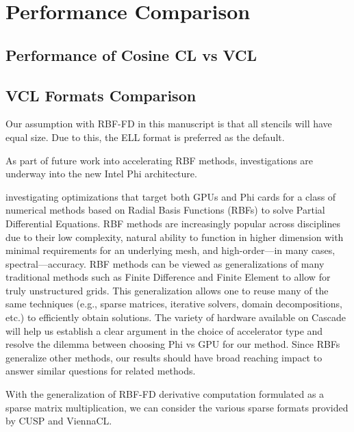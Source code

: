 \documentclass{report}
\begin{document}

\section{Performance Comparison}
\subsection{Performance of Cosine CL vs VCL}
\subsection{VCL Formats Comparison}

Our assumption with RBF-FD in this manuscript is that all stencils will have equal size. Due to this, the ELL format is preferred as the default. 
 



As part of future work into accelerating RBF methods, investigations are underway into the new Intel Phi architecture. 

 investigating optimizations that target both GPUs and Phi cards for a class of numerical methods based on Radial Basis Functions (RBFs) to solve Partial Differential Equations. RBF methods are increasingly popular across disciplines due to their low complexity, natural ability to function in higher dimension with minimal requirements for an underlying mesh, and high-order---in many cases, spectral---accuracy. RBF methods can be viewed as generalizations of many traditional methods such as Finite Difference and Finite Element to allow for truly unstructured grids. This generalization allows one to reuse many of the same techniques (e.g., sparse matrices, iterative solvers, domain decompositions, etc.) to efficiently obtain solutions. The variety of hardware available on Cascade will help us establish a clear argument in the choice of accelerator type and resolve the dilemma between choosing Phi vs GPU for our method. Since RBFs generalize other methods, our results should have broad reaching impact to answer similar questions for related methods.



With the generalization of RBF-FD derivative computation formulated as a sparse matrix multiplication, we can 
consider the various sparse formats provided by CUSP and ViennaCL. 

\end{document}
